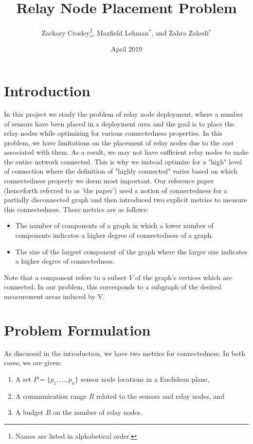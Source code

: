 \documentclass{article}
\title{Relay Node Placement Problem}
\author{Zackary Crosley\thanks{Names are listed in alphabetical order.}, Maxfield Lehman$^*$, and Zahra Zahedi$^*$}
\date{April 2019}
\begin{document}
\maketitle
\section{Introduction}
In this project we study the problem of relay node deployment, where a number of sensors have been placed in a deployment area and the goal is to place the relay nodes while optimizing for various connectedness properties.
In this problem, we have limitations on the placement of relay nodes due to the cost associated with them.
As a result, we may not have sufficient relay nodes to make the entire network connected.
This is why we instead optimize for a "high" level of connection where the definition of "highly connected" varies based on which connectedness property we deem most important.
Our reference paper \cite{relay-node} (henceforth referred to as 'the paper') used a notion of connectedness for a partially disconnected graph and then introduced two explicit metrics to measure this connectedness.
These metrics are as follows:
\begin{itemize}
    \item The number of components of a graph in which a lower number of components indicates a higher degree of connectedness of a graph.
    \item The size of the largest component of the graph where the larger size indicates a higher degree of connectedness.
\end{itemize}
Note that a component refers to a subset $V$ of the graph's vertices which are connected.
In our problem, this corresponds to a subgraph of the desired measurement areas induced by V.
\section{Problem Formulation}
As discussed in the introduction, we have two metrics for connectedness. In both cases, we are given:
\begin{enumerate}
\item A set $P=\{p_1, \hdots, p_n\}$ sensor node locations in a Euclidean plane,
\item A communication range $R$ related to the sensors and relay nodes, and
\item A budget $B$  on the number of relay nodes.
\end{enumerate}
\end{document}
